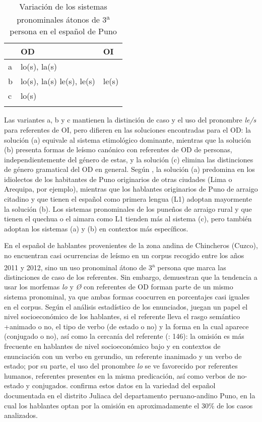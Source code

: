 \documentclass[output=paper]{../langscibook}
\begin{document}
\begin{table}
\caption{\label{tab:mick:2} Variación de los sistemas pronominales átonos de 3\textsuperscript{a} persona en el español de Puno \citep[188]{Godenzzi1986}}
\begin{tabular}{lll}
\lsptoprule
& { \textbf{OD}} & \textbf{OI}\\
\midrule
 a & lo(s), la(s) &\\
 b & lo(s), la(s)  le(s), le(s) & le(s) \\
 c & lo(s) & \\
\lspbottomrule
\end{tabular}
\end{table}

Las variantes a, b y c mantienen la distinción de caso y el uso del pronombre \textit{le/s} para referentes de OI, pero difieren en las soluciones encontradas para el OD: la solución (a) equivale al sistema etimológico dominante, mientras que la solución (b) presenta formas de leísmo canónico con referentes de OD de personas, independientemente del género de estas, y la solución (c) elimina las distinciones de género gramatical del OD en general. Según \citet{Godenzzi1986}, la solución (a) predomina en los idiolectos de los habitantes de Puno originarios de otras ciudades (Lima o Arequipa, por ejemplo), mientras que los hablantes originarios de Puno de arraigo citadino y que tienen el español como primera lengua (L1) adoptan mayormente la solución (b). Los sistemas pronominales de los puneños de arraigo rural y que tienen el quechua o el aimara como L1 tienden más al sistema (c), pero también adoptan los sistemas (a) y (b) en contextos más específicos. 

En el español de hablantes provenientes de la zona andina de Chincheros (Cuzco), \citet{GarcíaTesoroFernándezMallat2015} no encuentran casi ocurrencias de leísmo en un corpus recogido entre los años 2011 y 2012, sino un uso pronominal átono de 3\textsuperscript{a} persona que marca las distinciones de caso de los referentes. Sin embargo, demuestran que la tendencia a usar los morfemas \textit{lo} y \textit{Ø} con referentes de OD forman parte de un mismo sistema pronominal, ya que ambas formas coocurren en porcentajes casi iguales en el corpus. Según el análisis estadístico de los enunciados, juegan un papel el nivel socioeconómico de los hablantes, si el referente lleva el rasgo semántico +animado o no, el tipo de verbo (de estado o no) y la forma en la cual aparece (conjugado o no), así como la cercanía del referente (\citealt{GarcíaTesoroFernándezMallat2015}: 146): la omisión es más frecuente en hablantes de nivel socioeconómico bajo y en contextos de enunciación con un verbo en gerundio, un referente inanimado y un verbo de estado; por su parte, el uso del pronombre \textit{lo} se ve favorecido por referentes humanos, referentes presentes en la misma predicación, así como verbos de no-estado y conjugados.  \citet{SánchezParaíso2019} confirma estos datos en la variedad del español documentada en el distrito Juliaca del departamento peruano-andino Puno, en la cual los hablantes optan por la omisión en aproximadamente el 30\% de los casos analizados.
\end{document}
